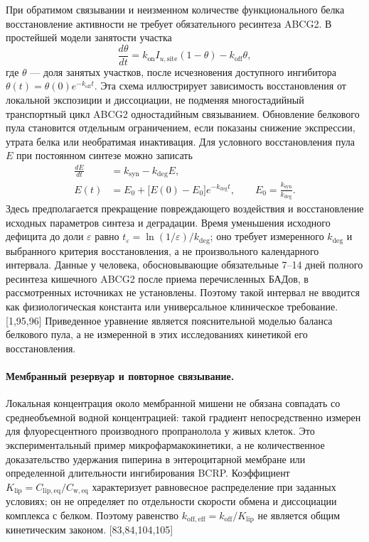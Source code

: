 \documentclass[11pt]{article}
\begin{document}
При обратимом связывании и неизменном количестве функционального белка восстановление активности не требует обязательного ресинтеза ABCG2. В простейшей модели занятости участка
\[
\frac{d\theta}{dt}=k_{\mathrm{on}}I_{u,\mathrm{site}}(1-\theta)
-k_{\mathrm{off}}\theta,
\]
где \(\theta\) --- доля занятых участков, после исчезновения доступного ингибитора \(\theta(t)=\theta(0)e^{-k_{\mathrm{off}}t}\). Эта схема иллюстрирует зависимость восстановления от локальной экспозиции и диссоциации, не подменяя многостадийный транспортный цикл ABCG2 одностадийным связыванием. Обновление белкового пула становится отдельным ограничением, если показаны снижение экспрессии, утрата белка или необратимая инактивация. Для условного восстановления пула \(E\) при постоянном синтезе можно записать
\[
\begin{aligned}
\frac{dE}{dt}&=k_{\mathrm{syn}}-k_{\mathrm{deg}}E,\\
E(t)&=E_0+\bigl[E(0)-E_0\bigr]e^{-k_{\mathrm{deg}}t},
\qquad E_0=\frac{k_{\mathrm{syn}}}{k_{\mathrm{deg}}}.
\end{aligned}
\]
Здесь предполагается прекращение повреждающего воздействия и восстановление исходных параметров синтеза и деградации. Время уменьшения исходного дефицита до доли \(\varepsilon\) равно \(t_{\varepsilon}=\ln(1/\varepsilon)/k_{\mathrm{deg}}\); оно требует измеренного \(k_{\mathrm{deg}}\) и выбранного критерия восстановления, а не произвольного календарного интервала. Данные у человека, обосновывающие обязательные 7--14 дней полного ресинтеза кишечного ABCG2 после приема перечисленных БАДов, в рассмотренных источниках не установлены. Поэтому такой интервал не вводится как физиологическая константа или универсальное клиническое требование. [1,95,96] Приведенное уравнение является пояснительной моделью баланса белкового пула, а не измеренной в этих исследованиях кинетикой его восстановления.

\paragraph{Мембранный резервуар и повторное связывание.}
Локальная концентрация около мембранной мишени не обязана совпадать со среднеобъемной водной концентрацией: такой градиент непосредственно измерен для флуоресцентного производного пропранолола у живых клеток. Это экспериментальный пример микрофармакокинетики, а не количественное доказательство удержания пиперина в энтероцитарной мембране или определенной длительности ингибирования BCRP. Коэффициент \(K_{\mathrm{lip}}=C_{\mathrm{lip,eq}}/C_{\mathrm{w,eq}}\) характеризует равновесное распределение при заданных условиях; он не определяет по отдельности скорости обмена и диссоциации комплекса с белком. Поэтому равенство \(k_{\mathrm{off,eff}}=k_{\mathrm{off}}/K_{\mathrm{lip}}\) не является общим кинетическим законом. [83,84,104,105]
\end{document}
